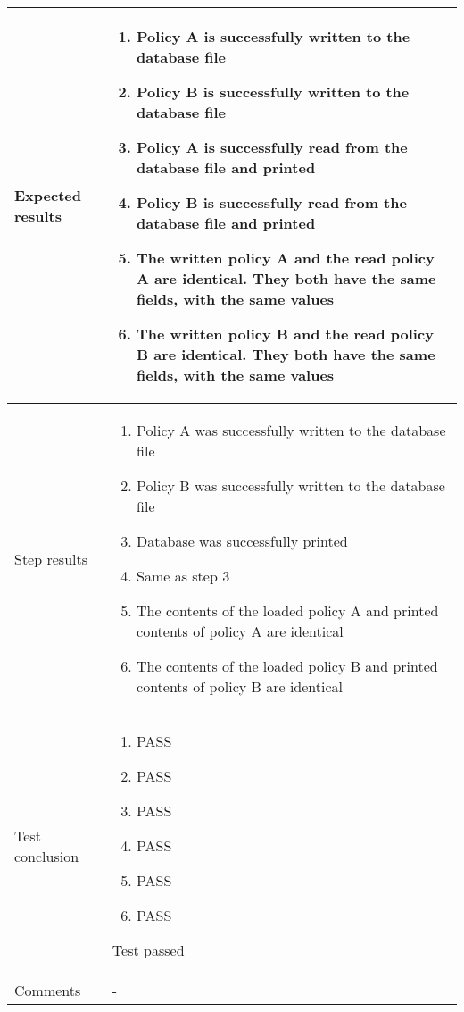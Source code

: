 \begin{center}
\begin{longtable}{ | p{4cm} | p{10cm} | }
			Expected results &	\begin{enumerate}
							\item Policy A is successfully written to the database file
							\item Policy B is successfully written to the database file
							\item Policy A is successfully read from the database file and printed
							\item Policy B is successfully read from the database file and printed
							\item The written policy A and the read policy A are identical. They both have the same fields, with the same values
							\item The written policy B and the read policy B are identical. They both have the same fields, with the same values
						\end{enumerate}
							 \\  [3pt] \hline

			Step results & 	\begin{enumerate}
							\item Policy A was successfully written to the database file
							\item Policy B was successfully written to the database file
							\item Database was successfully printed
							\item Same as step 3
							\item The contents of the loaded policy A and printed contents of policy A are identical
							\item The contents of the loaded policy B and printed contents of policy B are identical
						\end{enumerate}
							 \\  [3pt] \hline

			Test conclusion & 	\begin{enumerate}
							\item PASS
							\item PASS
							\item PASS
							\item PASS
							\item PASS
							\item PASS
						\end{enumerate}
						Test passed \\  [3pt] \hline
			Comments &	- \\ [3pt] \hline
		\end{longtable}
	\end{center}

